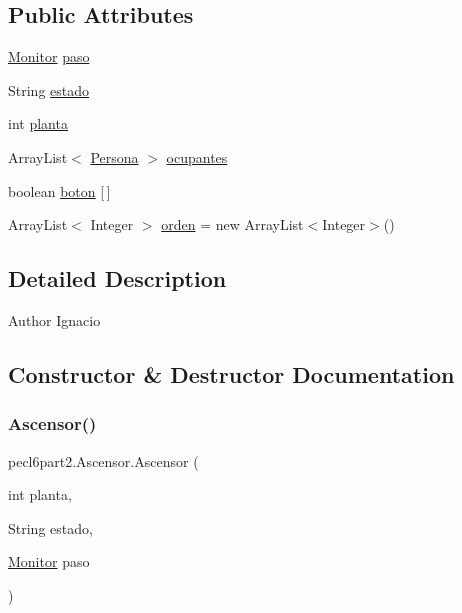 \subsection*{Public Attributes}
\begin{DoxyCompactItemize}
\item 
\mbox{\hyperlink{classpecl6part2_1_1_monitor}{Monitor}} \mbox{\hyperlink{classpecl6part2_1_1_ascensor_adc56f3cc0cc6adaf409f5aeb4283808f}{paso}}
\item 
String \mbox{\hyperlink{classpecl6part2_1_1_ascensor_a6a578a2c1bc59586257fe412a44354ac}{estado}}
\item 
int \mbox{\hyperlink{classpecl6part2_1_1_ascensor_a66017643cc6554b17d447867a0c0d619}{planta}}
\item 
Array\+List$<$ \mbox{\hyperlink{classpecl6part2_1_1_persona}{Persona}} $>$ \mbox{\hyperlink{classpecl6part2_1_1_ascensor_af4dd01a24c9588e94061d4e61045563a}{ocupantes}}
\item 
boolean \mbox{\hyperlink{classpecl6part2_1_1_ascensor_a537cb674ee504643dd08130f89e1e068}{boton}} \mbox{[}$\,$\mbox{]}
\item 
Array\+List$<$ Integer $>$ \mbox{\hyperlink{classpecl6part2_1_1_ascensor_a92a9c3265671bd3d2654626f62094cf9}{orden}} = new Array\+List$<$Integer$>$()
\end{DoxyCompactItemize}


\subsection{Detailed Description}
\begin{DoxyAuthor}{Author}
Ignacio 
\end{DoxyAuthor}


\subsection{Constructor \& Destructor Documentation}
\mbox{\label{classpecl6part2_1_1_ascensor_a4d9a2b5177e6f4d52b05b3de925c22ba}} 
\subsubsection{\texorpdfstring{Ascensor()}{Ascensor()}}
{\footnotesize\ttfamily pecl6part2.\+Ascensor.\+Ascensor (\begin{DoxyParamCaption}\item[{int}]{planta,  }\item[{String}]{estado,  }\item[{\mbox{\hyperlink{classpecl6part2_1_1_monitor}{Monitor}}}]{paso }\end{DoxyParamCaption})\hspace{0.3cm}{\ttfamily [inline]}}


